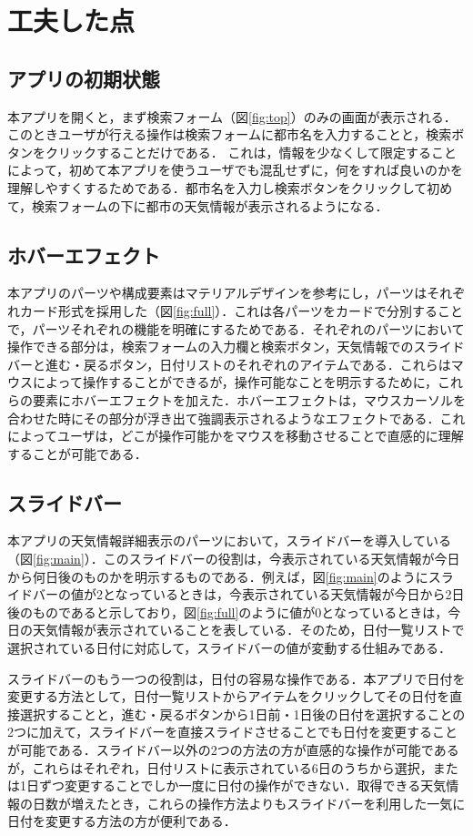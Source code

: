 \section{工夫した点}

\subsection{アプリの初期状態}
本アプリを開くと，まず検索フォーム（図\ref{fig:top}）のみの画面が表示される．このときユーザが行える操作は検索フォームに都市名を入力することと，検索ボタンをクリックすることだけである．
これは，情報を少なくして限定することによって，初めて本アプリを使うユーザでも混乱せずに，何をすれば良いのかを理解しやすくするためである．都市名を入力し検索ボタンをクリックして初めて，検索フォームの下に都市の天気情報が表示されるようになる．

\subsection{ホバーエフェクト}
本アプリのパーツや構成要素はマテリアルデザインを参考にし，パーツはそれぞれカード形式を採用した（図\ref{fig:full}）．これは各パーツをカードで分別することで，パーツそれぞれの機能を明確にするためである．それぞれのパーツにおいて操作できる部分は，検索フォームの入力欄と検索ボタン，天気情報でのスライドバーと進む・戻るボタン，日付リストのそれぞれのアイテムである．これらはマウスによって操作することができるが，操作可能なことを明示するために，これらの要素にホバーエフェクトを加えた．ホバーエフェクトは，マウスカーソルを合わせた時にその部分が浮き出て強調表示されるようなエフェクトである．これによってユーザは，どこが操作可能かをマウスを移動させることで直感的に理解することが可能である．

\subsection{スライドバー}
本アプリの天気情報詳細表示のパーツにおいて，スライドバーを導入している（図\ref{fig:main}）．このスライドバーの役割は，今表示されている天気情報が今日から何日後のものかを明示するものである．例えば，図\ref{fig:main}のようにスライドバーの値が2となっているときは，今表示されている天気情報が今日から2日後のものであると示しており，図\ref{fig:full}のように値が0となっているときは，今日の天気情報が表示されていることを表している．そのため，日付一覧リストで選択されている日付に対応して，スライドバーの値が変動する仕組みである．

スライドバーのもう一つの役割は，日付の容易な操作である．本アプリで日付を変更する方法として，日付一覧リストからアイテムをクリックしてその日付を直接選択することと，進む・戻るボタンから1日前・1日後の日付を選択することの2つに加えて，スライドバーを直接スライドさせることでも日付を変更することが可能である．スライドバー以外の2つの方法の方が直感的な操作が可能であるが，これらはそれぞれ，日付リストに表示されている6日のうちから選択，または1日ずつ変更することでしか一度に日付の操作ができない．取得できる天気情報の日数が増えたとき，これらの操作方法よりもスライドバーを利用した一気に日付を変更する方法の方が便利である．

